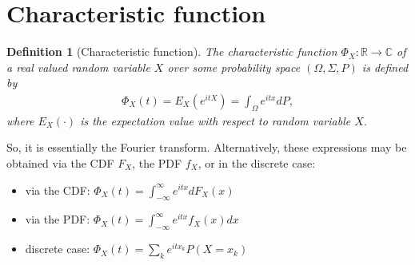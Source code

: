 \documentclass[10pt,a4paper]{article}
\newtheorem{definition}{Definition}
\begin{document}
\section{Characteristic function}
\begin{definition}[Characteristic function] \label{def_characteristic_function}
The characteristic function $\Phi_X :  \mathbb R \rightarrow \mathbb C$
of a real valued random variable $X$ over some probability space $(\Omega, \Sigma, P)$  
is defined by
\begin{align}
\Phi_X(t) = E_X(e^{itX}) =\int_{\Omega} e^{itx} dP,
\end{align}
where $E_X(\cdot)$ is the expectation value with respect to random variable $X$.
\end{definition} 
So, it is essentially the Fourier transform. Alternatively, these expressions may be obtained via the CDF $F_X$, the PDF $f_X$, or in the discrete case: 
\begin{itemize}
\item via the CDF:  $\Phi_X(t) = \int_{-\infty}^{\infty} e^{itx} dF_X(x)$
\item via the PDF:  $\Phi_X(t) = \int_{-\infty}^{\infty} e^{itx} f_X(x) dx$
 \item discrete case: $\Phi_X(t) = \sum_k e^{itx_k} P(X=x_k)$
\end{itemize}
\end{document}
